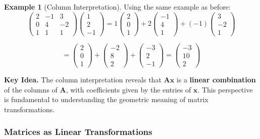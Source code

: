 \documentclass[12pt]{article}
\numberwithin{equation}{section}
\newcommand{\vect}[1]{\boldsymbol{#1}}   %
\newcommand{\mat}[1]{\mathbf{#1}}        %
\theoremstyle{plain}
\theoremstyle{definition}
\newtheorem{example}[theorem]{Example}
\theoremstyle{remark}
\newenvironment{keyidea}{\begin{tcolorbox}\textbf{Key Idea.}}{\end{tcolorbox}}
\begin{document}
\begin{example}[Column Interpretation]
Using the same example as before:
$$\begin{pmatrix} 2 & -1 & 3 \\ 0 & 4 & -2 \\ 1 & 1 & 1 \end{pmatrix} \begin{pmatrix} 1 \\ 2 \\ -1 \end{pmatrix} = 1\begin{pmatrix} 2 \\ 0 \\ 1 \end{pmatrix} + 2\begin{pmatrix} -1 \\ 4 \\ 1 \end{pmatrix} + (-1)\begin{pmatrix} 3 \\ -2 \\ 1 \end{pmatrix}$$

$$= \begin{pmatrix} 2 \\ 0 \\ 1 \end{pmatrix} + \begin{pmatrix} -2 \\ 8 \\ 2 \end{pmatrix} + \begin{pmatrix} -3 \\ 2 \\ -1 \end{pmatrix} = \begin{pmatrix} -3 \\ 10 \\ 2 \end{pmatrix}$$
\end{example}

\begin{keyidea}
The column interpretation reveals that $\mat{A}\vect{x}$ is a \textbf{linear combination} of the columns of $\mat{A}$, with coefficients given by the entries of $\vect{x}$. This perspective is fundamental to understanding the geometric meaning of matrix transformations.
\end{keyidea}

\subsubsection{Matrices as Linear Transformations}
\end{document}
